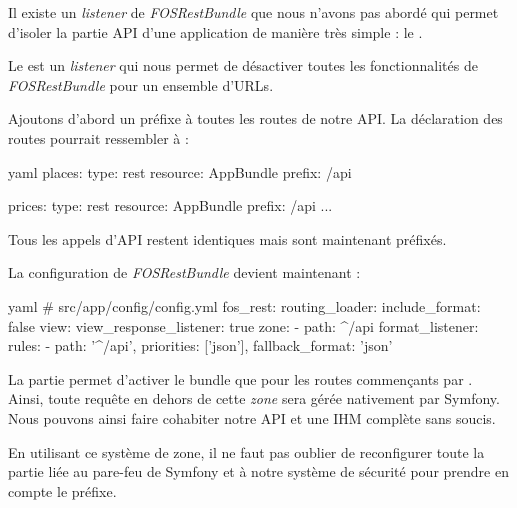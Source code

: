 \documentclass[big]{zmdocument}
\begin{document}


Il existe un \textit{listener} de \textit{FOSRestBundle} que nous n'avons pas abordé qui permet d'isoler la partie API d'une application de manière très simple : le .



Le  est un \textit{listener} qui nous permet de désactiver toutes les fonctionnalités de \textit{FOSRestBundle} pour un ensemble d'URLs.



Ajoutons d'abord un préfixe  à toutes les routes de notre API. La déclaration des routes pourrait ressembler à :



\begin{CodeBlock}{yaml}
places:
    type:     rest
    resource: AppBundle\Controller\PlaceController
    prefix: /api

prices:
    type:     rest
    resource: AppBundle\Controller\Place\PriceController
    prefix: /api
...
\end{CodeBlock}



Tous les appels d'API restent identiques mais sont maintenant préfixés.



La configuration de \textit{FOSRestBundle} devient maintenant :



\begin{CodeBlock}{yaml}
# src/app/config/config.yml
fos_rest:
    routing_loader:
        include_format: false
    view:
        view_response_listener: true
    zone:
        - { path: ^/api }
    format_listener:
        rules:
            - { path: '^/api', priorities: ['json'], fallback_format: 'json' }
\end{CodeBlock}



La partie  permet d'activer le bundle que pour les routes commençants par . Ainsi, toute requête en dehors de cette \textit{zone} sera gérée nativement par Symfony. Nous pouvons ainsi faire cohabiter notre API et une IHM complète sans soucis.



En utilisant ce système de zone, il ne faut pas oublier de reconfigurer toute la partie liée au pare-feu de Symfony et à notre système de sécurité pour prendre en compte le préfixe.
\end{document}
